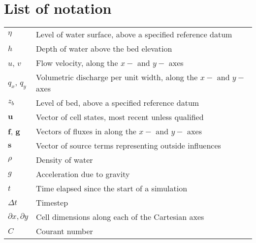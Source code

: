 \chapter*{List of notation}
\begin{tabular}{p{1.75cm}p{10cm}}
	$\eta$ 					& Level of water surface, above a specified reference datum \\
	$h$						& Depth of water above the bed elevation \\
	$u$, $v$				& Flow velocity, along the $x-$ and $y-$ axes \\
	$q_{x}$, $q_{y}$		& Volumetric discharge per unit width, along the $x-$ and $y-$ axes \\
	$z_{b}$					& Level of bed, above a specified reference datum \\
	$\mathbf{u}$			& Vector of cell states, most recent unless qualified \\
	$\mathbf{f}$, $\mathbf{g}$	& Vectors of fluxes in along the $x-$ and $y-$ axes \\
	$\mathbf{s}$			& Vector of source terms representing outside influences \\
	$\rho$					& Density of water \\
	$g$						& Acceleration due to gravity \\
	$t$						& Time elapsed since the start of a simulation \\
	$\Delta t$ 				& Timestep \\
	$\partial x, \partial y$ 	& Cell dimensions along each of the Cartesian axes \\
	$C$ 					& Courant number \\
\end{tabular}
